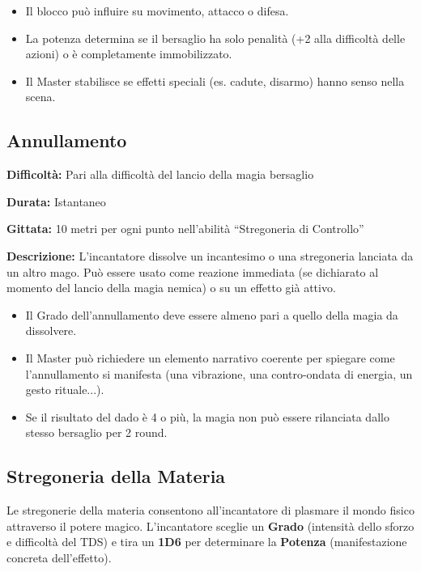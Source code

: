 \documentclass[./magie.tex]{subfiles}
\begin{document}
\begin{itemize}
\item Il blocco può influire su movimento, attacco o difesa.
\item La potenza determina se il bersaglio ha solo penalità (+2 alla difficoltà delle azioni) o è completamente immobilizzato.
\item Il Master stabilisce se effetti speciali (es. cadute, disarmo) hanno senso nella scena.
\end{itemize}

\clearpage
\subsection*{Annullamento}
\begin{description}
\item \textbf{Difficoltà:} Pari alla difficoltà del lancio della magia bersaglio
\item \textbf{Durata:} Istantaneo
\item \textbf{Gittata:} 10 metri per ogni punto nell’abilità “Stregoneria di Controllo”
\item \textbf{Descrizione:} L’incantatore dissolve un incantesimo o una stregoneria lanciata da un altro mago. Può essere usato come reazione immediata (se dichiarato al momento del lancio della magia nemica) o su un effetto già attivo.
\end{description}

\begin{itemize}
\item Il Grado dell’annullamento deve essere almeno pari a quello della magia da dissolvere.
\item Il Master può richiedere un elemento narrativo coerente per spiegare come l’annullamento si manifesta (una vibrazione, una contro-ondata di energia, un gesto rituale...).
\item Se il risultato del dado è 4 o più, la magia non può essere rilanciata dallo stesso bersaglio per 2 round.
\end{itemize}

\clearpage
\vspace{0.2cm}
\subsection{Stregoneria della Materia}

Le stregonerie della materia consentono all’incantatore di plasmare il mondo fisico attraverso il potere magico. L’incantatore sceglie un \textbf{Grado} (intensità dello sforzo e difficoltà del TDS) e tira un \textbf{1D6} per determinare la \textbf{Potenza} (manifestazione concreta dell’effetto).
\end{document}
